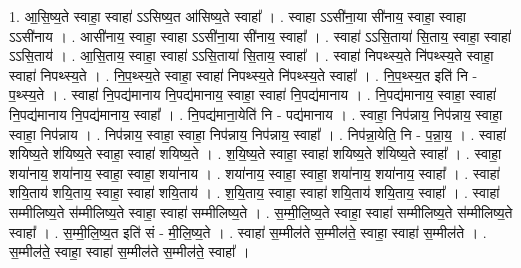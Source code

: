 \documentclass[17pt]{extarticle}
\begin{document}
1. आ॒सि॒ष्य॒ते स्वाहा॒ स्वाहा॑ ऽऽसिष्य॒त आ॑सिष्य॒ते स्वाहा᳚ । . स्वाहा ऽऽसी॑ना॒या सी॑नाय॒ स्वाहा॒ स्वाहा ऽऽसी॑नाय । . आसी॑नाय॒ स्वाहा॒ स्वाहा ऽऽसी॑ना॒या सी॑नाय॒ स्वाहा᳚ । . स्वाहा॑ ऽऽसि॒ताया॑ सि॒ताय॒ स्वाहा॒ स्वाहा॑ ऽऽसि॒ताय॑ । . आ॒सि॒ताय॒ स्वाहा॒ स्वाहा॑ ऽऽसि॒ताया॑ सि॒ताय॒ स्वाहा᳚ । . स्वाहा॑ निपथ्स्य॒ते नि॑पथ्स्य॒ते स्वाहा॒ स्वाहा॑ निपथ्स्य॒ते । . नि॒प॒थ्स्य॒ते स्वाहा॒ स्वाहा॑ निपथ्स्य॒ते नि॑पथ्स्य॒ते स्वाहा᳚ । . नि॒प॒थ्स्य॒त इति॑ नि - प॒थ्स्य॒ते । . स्वाहा॑ नि॒पद्य॑मानाय नि॒पद्य॑मानाय॒ स्वाहा॒ स्वाहा॑ नि॒पद्य॑मानाय । . नि॒पद्य॑मानाय॒ स्वाहा॒ स्वाहा॑ नि॒पद्य॑मानाय नि॒पद्य॑मानाय॒ स्वाहा᳚ । . नि॒पद्य॑माना॒येति॑ नि - पद्य॑मानाय । . स्वाहा॒ निप॑न्नाय॒ निप॑न्नाय॒ स्वाहा॒ स्वाहा॒ निप॑न्नाय । . निप॑न्नाय॒ स्वाहा॒ स्वाहा॒ निप॑न्नाय॒ निप॑न्नाय॒ स्वाहा᳚ । . निप॑न्ना॒येति॒ नि - प॒न्ना॒य॒ । . स्वाहा॑ शयिष्य॒ते श॑यिष्य॒ते स्वाहा॒ स्वाहा॑ शयिष्य॒ते । . श॒यि॒ष्य॒ते स्वाहा॒ स्वाहा॑ शयिष्य॒ते श॑यिष्य॒ते स्वाहा᳚ । . स्वाहा॒ शया॑नाय॒ शया॑नाय॒ स्वाहा॒ स्वाहा॒ शया॑नाय । . शया॑नाय॒ स्वाहा॒ स्वाहा॒ शया॑नाय॒ शया॑नाय॒ स्वाहा᳚ । . स्वाहा॑ शयि॒ताय॑ शयि॒ताय॒ स्वाहा॒ स्वाहा॑ शयि॒ताय॑ । . श॒यि॒ताय॒ स्वाहा॒ स्वाहा॑ शयि॒ताय॑ शयि॒ताय॒ स्वाहा᳚ । . स्वाहा॑ सम्मीलिष्य॒ते स॑म्मीलिष्य॒ते स्वाहा॒ स्वाहा॑ सम्मीलिष्य॒ते । . स॒म्मी॒लि॒ष्य॒ते स्वाहा॒ स्वाहा॑ सम्मीलिष्य॒ते स॑म्मीलिष्य॒ते स्वाहा᳚ । . स॒म्मी॒लि॒ष्य॒त इति॑ सं - मी॒लि॒ष्य॒ते । . स्वाहा॑ स॒म्मील॑ते स॒म्मील॑ते॒ स्वाहा॒ स्वाहा॑ स॒म्मील॑ते । . स॒म्मील॑ते॒ स्वाहा॒ स्वाहा॑ स॒म्मील॑ते स॒म्मील॑ते॒ स्वाहा᳚ । \newline
\end{document}
